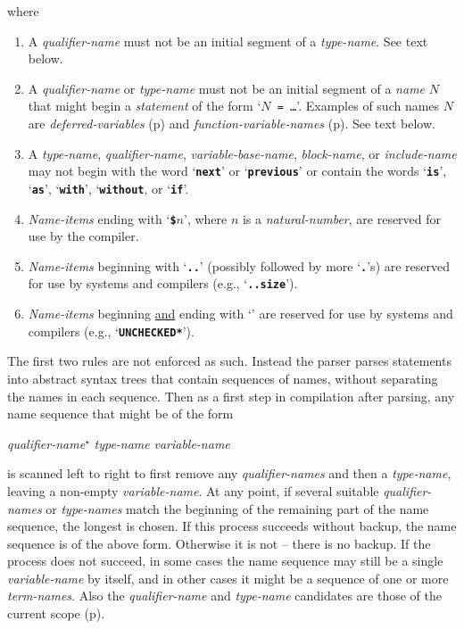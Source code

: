 \documentclass[12pt]{article}
\newcommand{\TT}[1]{{\tt \bfseries #1}}
\newcommand{\pagref}[1]{p\pageref{#1}}
\newcommand{\STAR}{{\Large $^\star$}}
\newcommand{\TMP}{\$}			%
\newenvironment{indpar}[1][0.3in]%
	{\begin{list}{}%
		     {\setlength{\itemsep}{0in}%
		      \setlength{\topsep}{0in}%
		      \setlength{\parsep}{1ex}%
		      \setlength{\labelwidth}{#1}%
		      \setlength{\leftmargin}{#1}%
		      \addtolength{\leftmargin}{\labelsep}}%
	 \item}%
	{\end{list}}
\begin{document}
\begin{indpar}
where
\begin{enumerate}
\item
A {\em qualifier-name} must not be an initial segment
of a {\em type-name}.  See text below.
\item
A {\em qualifier-name} or {\em type-name} must not be an initial segment
of a {\em name} $N$ that might begin a {\em statement} of
the form `{\tt $N$ = \ldots}'.  Examples of such names $N$
are {\em deferred-variables} (\pagref{DEFERRED-VARIABLE})
and {\em function-variable-names} (\pagref{FUNCTION-VARIABLE-NAME}).
See text below.
\label{TYPE-NAME-RULE}
\item
A {\em type-name}, {\em qualifier-name}, {\em variable-base-name},
{\em block-name}, or {\em include-name}
may not begin with the word `\TT{next}' or `\TT{previous}' or
contain the words `\TT{is}', `\TT{as}', `\TT{with}', `\TT{without},
or `\TT{if}'.
\item
{\em Name-items} ending with `\TT{\TMP$n$}',
where $n$ is a {\em natural-number}, are
reserved for use by the compiler.
\item
{\em Name-items} beginning with `\TT{..}' (possibly followed by more
`\TT{.}'s) are reserved
for use by systems and compilers (e.g., `\TT{..size}').
\item
{\em Name-items} beginning \underline{and} ending
with `\TT{*}' are reserved
for use by systems and compilers (e.g., `\TT{*UNCHECKED*}').
\end{enumerate}
\end{indpar}

The first two rules are not enforced as such.  Instead the parser
parses statements into abstract syntax trees that contain
sequences of names, without separating the names in each sequence.
Then as a first step in compilation after parsing,
any name sequence that might be of the form
\begin{center}
{\em qualifier-name}\STAR{} {\em type-name} {\em variable-name}
\end{center}
is scanned left to right to first remove any {\em qualifier-names}
and then a {\em type-name}, leaving a non-empty {\em variable-name}.
At any point, if several suitable {\em qualifier-names} or
{\em type-names} match the
beginning of the remaining part of the name sequence, the longest
is chosen.  If this process succeeds without backup, the name
sequence is of the above form.  Otherwise it is not -- there is
no backup.  If the process does not succeed, in some
cases the name sequence may still be a single {\em variable-name}
by itself, and in other cases it might be a sequence of one or
more {\em term-names}.
Also the {\em qualifier-name} and {\em type-name}
candidates are those of the current scope (\pagref{SCOPE}).
\end{document}
